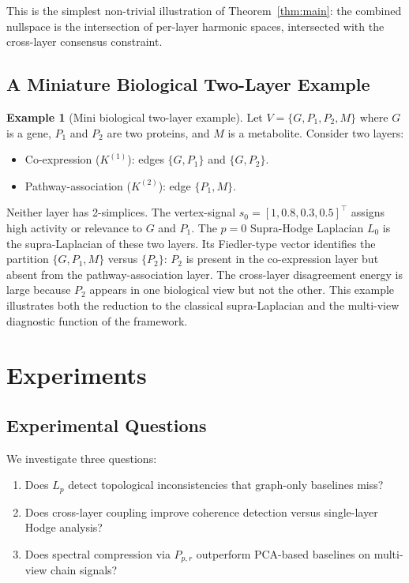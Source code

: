 \documentclass[11pt]{article}
\theoremstyle{definition}
\newtheorem{example}[theorem]{Example}
\theoremstyle{remark}
\newcommand{\Pp}{P_{p,r}}
\begin{document}
This is the simplest non-trivial illustration of Theorem~\ref{thm:main}: the
combined nullspace is the intersection of per-layer harmonic spaces, intersected
with the cross-layer consensus constraint.

\subsection{A Miniature Biological Two-Layer Example}

\begin{example}[Mini biological two-layer example]
\label{ex:mini_mv_rel}
Let $V = \{G, P_1, P_2, M\}$ where $G$ is a gene, $P_1$ and $P_2$ are two proteins, and $M$ is a metabolite. Consider two layers:
\begin{itemize}
\item Co-expression ($K^{(1)}$): edges $\{G,P_1\}$ and $\{G,P_2\}$.
\item Pathway-association ($K^{(2)}$): edge $\{P_1,M\}$.
\end{itemize}
Neither layer has 2-simplices. The vertex-signal $s_0 = [1,0.8,0.3,0.5]^\top$ assigns high activity or relevance to $G$ and $P_1$. The $p=0$ Supra-Hodge Laplacian $L_0$ is the supra-Laplacian of these two layers. Its Fiedler-type vector identifies the partition $\{G,P_1,M\}$ versus $\{P_2\}$: $P_2$ is present in the co-expression layer but absent from the pathway-association layer. The cross-layer disagreement energy is large because $P_2$ appears in one biological view but not the other. This example illustrates both the reduction to the classical supra-Laplacian and the multi-view diagnostic function of the framework.
\end{example}


\section{Experiments}
\label{sec:experiments}

\subsection{Experimental Questions}

We investigate three questions:
\begin{enumerate}
\item Does $L_p$ detect topological inconsistencies that graph-only baselines
      miss?
\item Does cross-layer coupling improve coherence detection versus single-layer
      Hodge analysis?
\item Does spectral compression via $\Pp$ outperform PCA-based baselines on
      multi-view chain signals?
\end{enumerate}
\end{document}
